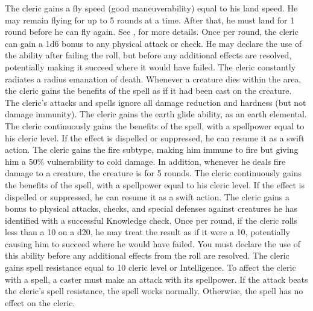 The cleric gains a fly speed (good maneuverability) equal to his land speed.
He may remain flying for up to 5 rounds at a time.
After that, he must land for 1 round before he can fly again.
See , for more details.
Once per round, the cleric can gain a \plus1d6 bonus to any physical attack or check.
He may declare the use of the ability after failing the roll, but before any additional effects are resolved, potentially making it succeed where it would have failed.
The cleric constantly radiates a \areamed radius emanation of death.
Whenever a creature dies within the area, the cleric gains the benefits of the  spell as if it had been cast on the creature.
The cleric's attacks and spells ignore all damage reduction and hardness (but not damage immunity).
The cleric gains the earth glide ability, as an earth elemental.
 The cleric continuously gains the benefits of the 
spell, with a spellpower equal to his cleric level.
If the effect is dispelled or suppressed, he can resume it as a swift action.
The cleric gains the fire subtype, making him immune to fire but giving him a 50\% vulnerability to cold damage.
In addition, whenever he deals fire damage to a creature, the creature is \ignited for 5 rounds.
 The cleric continuously gains the benefits of the 
spell, with a spellpower equal to his cleric level.
If the effect is dispelled or suppressed, he can resume it as a swift action.
The cleric gains a  bonus to physical attacks, checks, and special defenses against creatures he has identified with a successful Knowledge check.
Once per round, if the cleric rolls less than a 10 on a d20, he may treat the result as if it were a 10, potentially causing him to succeed where he would have failed.
You must declare the use of this ability before any additional effects from the roll are resolved.
The cleric gains spell resistance equal to 10 \add cleric level or Intelligence.
To affect the cleric with a spell, a caster must make an attack with its spellpower.
If the attack beats the cleric's spell resistance, the spell works normally.
Otherwise, the spell has no effect on the cleric.

